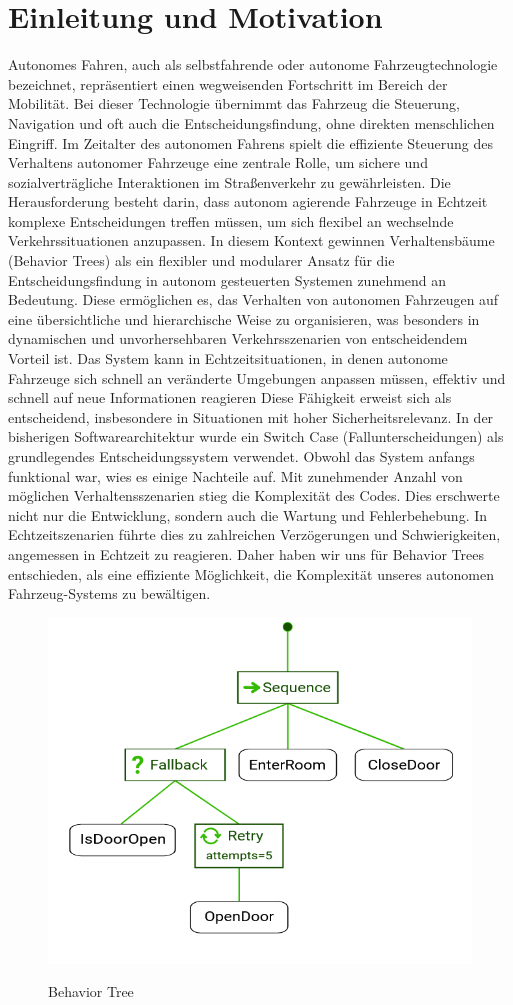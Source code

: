 \section{Einleitung und Motivation}
Autonomes Fahren, auch als selbstfahrende oder autonome Fahrzeugtechnologie bezeichnet, repräsentiert einen wegweisenden Fortschritt im Bereich der Mobilität. Bei dieser Technologie übernimmt das Fahrzeug die Steuerung, Navigation und oft auch die Entscheidungsfindung, ohne direkten menschlichen Eingriff. Im Zeitalter des autonomen Fahrens spielt die effiziente Steuerung des Verhaltens autonomer Fahrzeuge eine zentrale Rolle, um sichere und sozialverträgliche Interaktionen im Straßenverkehr zu gewährleisten. Die Herausforderung besteht darin, dass autonom agierende Fahrzeuge in Echtzeit komplexe Entscheidungen treffen müssen, um sich flexibel an wechselnde Verkehrssituationen anzupassen. In diesem Kontext gewinnen Verhaltensbäume (Behavior Trees) als ein flexibler und modularer Ansatz für die Entscheidungsfindung in autonom gesteuerten Systemen zunehmend an Bedeutung. Diese ermöglichen es, das Verhalten von autonomen Fahrzeugen auf eine übersichtliche und hierarchische Weise zu organisieren, was besonders in dynamischen und unvorhersehbaren Verkehrsszenarien von entscheidendem Vorteil ist. Das System kann in Echtzeitsituationen, in denen autonome Fahrzeuge sich schnell an veränderte Umgebungen anpassen müssen, effektiv und schnell auf neue Informationen reagieren Diese Fähigkeit erweist sich als entscheidend, insbesondere in Situationen mit hoher Sicherheitsrelevanz. In der bisherigen Softwarearchitektur wurde ein Switch Case (Fallunterscheidungen) als grundlegendes Entscheidungssystem verwendet. Obwohl das System anfangs funktional war, wies es einige Nachteile auf. Mit zunehmender Anzahl von möglichen Verhaltensszenarien stieg die Komplexität des Codes. Dies erschwerte nicht nur die Entwicklung, sondern auch die Wartung und Fehlerbehebung. In Echtzeitszenarien führte dies zu zahlreichen Verzögerungen und Schwierigkeiten, angemessen in Echtzeit zu reagieren. Daher haben wir uns für Behavior Trees entschieden, als eine effiziente Möglichkeit, die Komplexität unseres autonomen Fahrzeug-Systems zu bewältigen. 
\begin{figure}
    \centering
    \includegraphics[width=0.45\linewidth]{Pictures/grafik.png}
    \caption{Behavior Tree}
    \cite{behaviortree}
    \label{fig:enter-label}
\end{figure}




